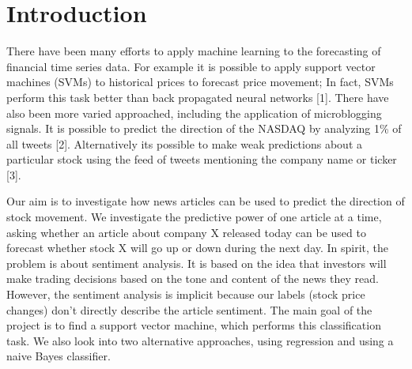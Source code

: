 \documentclass{article}
\begin{document}
 



\section{Introduction}


There have been many efforts to apply machine learning to the forecasting of financial time series data. For example it is possible to apply support vector machines (SVMs) to historical prices to forecast price movement; In fact, SVMs perform this task better than back propagated neural networks [1]. There have also been more varied approached, including the application of microblogging signals. It is possible to predict the direction of the NASDAQ by analyzing 1\% of all tweets [2]. Alternatively its possible to make weak predictions about a particular stock using the feed of tweets mentioning the company name or ticker [3].

Our aim is to investigate how news articles can be used to predict the direction of stock movement. We investigate the predictive power of one article at a time, asking whether an article about company X released today can be used to forecast whether stock X will go up or down during the next day. In spirit, the problem is about sentiment analysis. It is based on the idea that investors will make trading decisions based on the tone and content of the news they read. However, the sentiment analysis is implicit because our labels (stock price changes) don't directly describe the article sentiment. The main goal of the project is to find a support vector machine, which performs this classification task. We also look into two alternative approaches, using regression and using a naive Bayes classifier.
\end{document}
